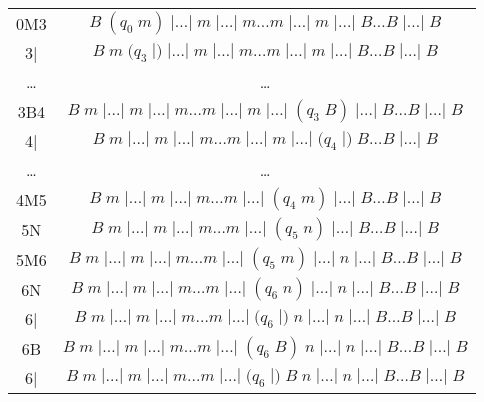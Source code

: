 \documentclass[a4paper, 12pt]{article}  %
\theoremstyle{definition}
\begin{document}
\begin{tabular}{ | c | c | }
		0M3 & $ B \; (q_0\; m) \; |\dots| \;  m \; | \dots | \; m \dots  m \; | \dots | \; m \; | \dots | \; B \dots  B \; | \dots | \; B$ \\
		3| & $ B \; m \; (q_3 \; |) \; | \dots| \;  m \; | \dots | \; m \dots  m \; | \dots | \; m \; | \dots | \; B \dots  B \; | \dots | \; B$ \\
		\dots & \dots \\
		3B4 & $ B \; m \; | \dots| \;  m \; | \dots | \; m \dots  m \; | \dots | \; m \; | \dots | \; (q_3 \; B) \; | \dots | \;B \dots  B \; | \dots | \; B$ \\
		4| & $ B \; m \; | \dots| \;  m \; | \dots | \; m \dots  m \; | \dots | \; m \; | \dots | \; (q_4 \; |) \;  B  \dots  B \; | \dots | \; B$ \\
		\dots & \dots \\
		4M5 & $ B \; m \; | \dots| \;  m \; | \dots | \; m \dots  m \; | \dots | \; (q_4 \; m) \; | \dots | \; B  \dots  B \; | \dots | \; B$ \\
		5N & $ B \; m \; | \dots| \;  m \; | \dots | \; m \dots  m \; | \dots | \; (q_5 \; n) \; | \dots | \; B \dots  B \; | \dots | \; B$ \\
		5M6 & $ B \; m \; | \dots| \;  m \; | \dots | \; m \dots m \; | \dots | \; (q_5 \; m) \; | \dots | \;  n \; | \dots | \; B \dots  B \; | \dots | \; B$ \\
		6N & $ B \; m \; | \dots| \;  m \; | \dots | \; m \dots m \; | \dots | \; (q_6 \; n) \; | \dots | \;  n \; | \dots | \; B \dots  B \; | \dots | \; B$ \\
		6| & $ B \; m \; | \dots| \;  m \; | \dots | \; m \dots m \; | \dots | \; (q_6 \; |) \;  n \; | \dots | \;  n \; | \dots | \; B \dots  B \; | \dots | \; B$ \\
		6B & $ B \; m \; | \dots| \;  m \; | \dots | \; m \dots m \; | \dots | \; (q_6 \; B) \;  n \; | \dots | \;  n \; | \dots | \; B \dots  B \; | \dots | \; B$ \\
		6| & $ B \; m \; | \dots| \;  m \; | \dots | \; m \dots m \; | \dots | \; (q_6 \; |) \;  B \;  n \; | \dots | \;  n \; | \dots | \; B \dots  B \; | \dots | \; B$ \\

\end{tabular}
\end{document}
